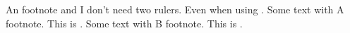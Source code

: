\documentclass[]{article}
\begin{document}
\beginnumbering
\pstart
An footnote
and I don't need two rulers. Even when using .
\pend
\newpage
\pstart
Some text with A footnote. This is .
\pend
\newpage
\pstart
Some text with B footnote. This is .
\pend
\endnumbering
\end{document}
